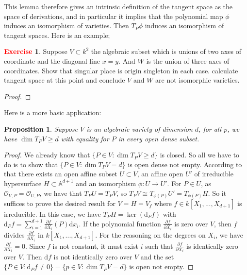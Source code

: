 \documentclass[12pt,a4paper,english]{article}
\theoremstyle{plain}
\newtheorem{prop}[thm]{Proposition}
\theoremstyle{definition}
\newtheorem{exercise}{\textbf{\textcolor{red}{Exercise}}}
\theoremstyle{remark}
\newcommand{\dif}{\text{d}}
\begin{document}
     This lemma therefore gives an intrinsic definition of the tangent space as the space of derivations, and in particular it implies that the polynomial map $\phi$ induces an isomorphism of varieties. Then $T_{P}\phi$ induces an isomorphism of tangent spaces. Here is an example;
     
\begin{exercise}
Suppose $V\subset k^{2}$ the algebraic subset which is unions of two axes of coordinate and the diagonal line $x=y$. And $W$ is the union of three axes of coordinates. Show that singular place is origin singleton in each case. calculate tangent space at this point and conclude $V$ and $W$ are not isomorphic varieties.
\end{exercise}
\begin{tcolorbox}
\begin{proof}

\end{proof}
\end{tcolorbox}
Here is a more basic application:
\begin{prop}
Suppose $V$ is an algebraic variety of dimension $d$, for all $p$, we have $\dim T_{P}V \geq d$ with equality for $P$ in every open dense subset.
\end{prop}
\begin{proof}
We already know that $\{P\in V: \dim T_{P}V\geq d \}$ is closed. So all we have to do is to show that $\{P\in V: \dim T_{P}V=d\}$ is open dense not empty. According to that there exists an open affine subset $U\subset V$, an affine open $U'$ of irreducible hypersurface $H\subset\mathbb{A}^{d+1}$ and an isomorphism $\phi:U\rightarrow U'$. For $P\in U$, as $\mathcal{O}_{V,P}=\mathcal{O}_{U,P}$, we have that $T_{P}U=T_{P}V$, so $T_{P}V\cong T_{\phi(P)}U'=T_{\phi(P)}H$. So it suffices to prove the desired result for $V=H=V_{f}$ where $f\in k[X_{1},...,X_{d+1}]$ is irreducible. In this case, we have $T_{P}H=\ker(\dif_{P}f)$ with $\dif_{P}f=\sum^{d+1}_{i=1}\frac{\partial f}{\partial X_{i}}(P)\dif x_{i}$. If the polynomial function $\frac{\partial f}{\partial X_{i}}$ is zero over $V$, then $f$ divides $\frac{\partial f}{\partial X_{i}}$ in $k[X_{1},...,X_{d+1}]$. For the reasoning on the degrees on $X_{i}$, we have $\frac{\partial f}{\partial X_{i}}=0$. Since $f$ is not constant, it must exist $i$ such that $\frac{\partial f}{\partial X_{i}}$ is identically zero over $V$. Then $\dif f$ is not identically zero over $V$ and the set $\{P\in V: \dif_{P}f\not=0\}=\{p\in V:\dim  T_{P}V=d\}$ is open not empty.
\end{proof}
\end{document}
